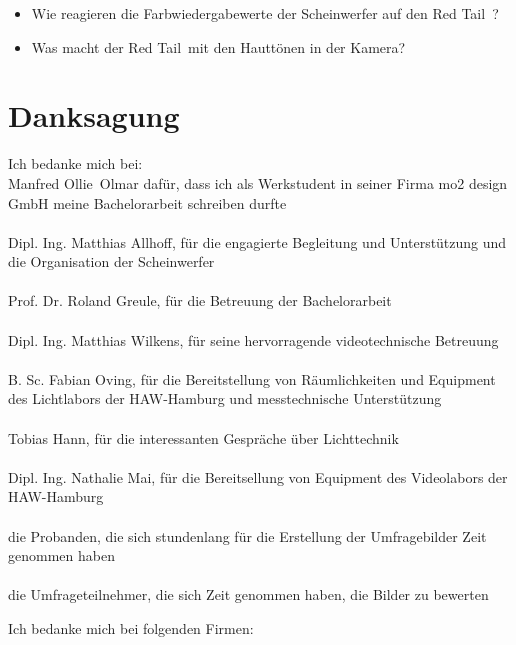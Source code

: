 \begin{itemize}
\item Wie reagieren die Farbwiedergabewerte der Scheinwerfer auf den \glqq Red Tail\grqq\ ?
\item Was macht der \glqq Red Tail\grqq\ mit den Hauttönen in der Kamera?
  
  
  \end{itemize}  

\chapter{Danksagung}

Ich bedanke mich bei:\\

\noindent Manfred \glqq Ollie\grqq\ Olmar dafür, dass ich als Werkstudent in seiner Firma mo2 design GmbH meine Bachelorarbeit schreiben durfte\\\\
Dipl. Ing. Matthias Allhoff, für die engagierte Begleitung und Unterstützung und die Organisation der Scheinwerfer\\\\
Prof. Dr. Roland Greule, für die Betreuung der Bachelorarbeit\\\\
Dipl. Ing. Matthias Wilkens, für seine hervorragende videotechnische Betreuung\\\\
B. Sc. Fabian Oving, für die Bereitstellung von  Räumlichkeiten und Equipment des Lichtlabors der HAW-Hamburg und messtechnische Unterstützung\\\\
Tobias Hann, für die interessanten Gespräche über Lichttechnik\\\\
Dipl. Ing. Nathalie Mai, für die Bereitsellung von Equipment des Videolabors der HAW-Hamburg\\\\
die Probanden, die sich stundenlang für die Erstellung der Umfragebilder Zeit genommen haben\\\\
die Umfrageteilnehmer, die sich Zeit genommen haben, die Bilder zu bewerten

\newpage

\noindent Ich bedanke mich bei folgenden Firmen:\\

